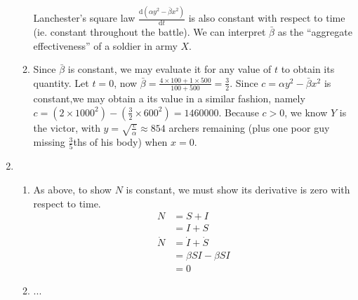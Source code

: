 \documentclass[10pt]{article}
\newcommand*{\dxdt}[1]{\frac{\text{d}#1}{\text{d}t}}
\begin{document}
\begin{enumerate}
\begin{enumerate}
          Lanchester's square law $\dxdt{(\alpha y^2 - \bar\beta x^2)}$ is also
          constant with respect to time (ie. constant throughout the battle).
          We can interpret $\bar\beta$ as the ``aggregate effectiveness'' of a
          soldier in army $X$.
        \item Since $\bar\beta$ is constant, we may evaluate it for any value
          of $t$ to obtain its quantity. Let $t=0$, now $\bar\beta = \tfrac{4
          \times 100 + 1 \times 500}{100 +500} = \tfrac{3}{2}$.
          Since $c = \alpha y^2 - \bar\beta x^2$ is constant,we may obtain a its
          value in a similar fashion, namely
          $c = (2 \times 1000^2) - (\tfrac{3}{2} \times 600^2) = 1 460 000$.
          Because $c > 0$, we know $Y$ is the victor, with $y =
          \sqrt{\tfrac{c}{\alpha}} \approx 854$ archers remaining (plus one
          poor guy missing $\tfrac{3}{5}$ths of  his body) when $x = 0$.
      \end{enumerate}
      \item
        \begin{enumerate}
          \item As above, to show $N$ is constant, we must show its derivative
            is zero with respect to time.
            \begin{align*}
              N &= S + I \\
                &= I + S \\
              \dot N &= \dot I + \dot S \\
                     &= \beta SI - \beta SI \\
                     &= 0
            \end{align*}
          \item ...

           \pagebreak


\end{enumerate}
\end{enumerate}
\end{document}
